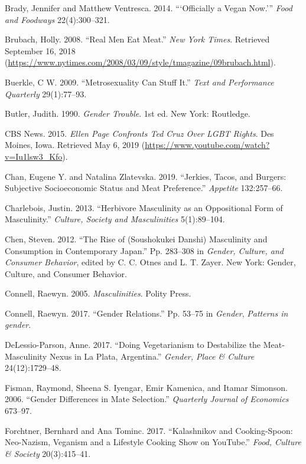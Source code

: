 \documentclass[twoside]{report}
\begin{document}
\hypertarget{brady}{Brady, Jennifer and Matthew Ventresca. 2014. ```Officially a Vegan
Now.''' \emph{Food and Foodways} 22(4):300--321.}

\hypertarget{brubach}{Brubach, Holly. 2008. ``Real Men Eat Meat.'' \emph{New York Times}.
Retrieved September 16, 2018
(\url{https://www.nytimes.com/2008/03/09/style/tmagazine/09brubach.html}).}

\hypertarget{buerkle}{Buerkle, C W. 2009. ``Metrosexuality Can Stuff It.'' \emph{Text and
Performance Quarterly} 29(1):77--93.}

\hypertarget{butler}{Butler, Judith. 1990. \emph{Gender Trouble}. 1st ed. New York:
Routledge.}

\hypertarget{cbs}{CBS News. 2015. \emph{Ellen Page Confronts Ted Cruz Over LGBT Rights}.
Des Moines, Iowa. Retrieved May 6, 2019
(\url{https://www.youtube.com/watch?v=Iu1lsw3_Kfo}).}

\hypertarget{chan}{Chan, Eugene Y. and Natalina Zlatevska. 2019. ``Jerkies, Tacos, and
Burgers: Subjective Socioeconomic Status and Meat Preference.''
\emph{Appetite} 132:257--66.}

\hypertarget{charlebois}{Charlebois, Justin. 2013. ``Herbivore Masculinity as an Oppositional
Form of Masculinity.'' \emph{Culture, Society and Masculinities}
5(1):89--104.}

\hypertarget{chen}{Chen, Steven. 2012. ``The Rise of (Soushokukei Danshi) Masculinity and
Consumption in Contemporary Japan.'' Pp. 283--308 in \emph{Gender,
Culture, and Consumer Behavior}, edited by C. C. Otnes and L. T. Zayer.
New York: Gender, Culture, and Consumer Behavior.}

\hypertarget{connell}{Connell, Raewyn. 2005. \emph{Masculinities}. Polity Press.}

\hypertarget{connell2}{Connell, Raewyn. 2017. ``Gender Relations.'' Pp. 53--75 in
\emph{Gender}, \emph{Patterns in gender}.}

\hypertarget{delassio-parson}{DeLessio-Parson, Anne. 2017. ``Doing Vegetarianism to Destabilize the
Meat-Masculinity Nexus in La Plata, Argentina.'' \emph{Gender, Place \&
Culture} 24(12):1729--48.}

\hypertarget{fisman}{Fisman, Raymond, Sheena S. Iyengar, Emir Kamenica, and Itamar Simonson.
2006. ``Gender Differences in Mate Selection.'' \emph{Quarterly Journal
of Economics} 673--97.}

\hypertarget{forchtner}{Forchtner, Bernhard and Ana Tominc. 2017. ``Kalashnikov and
Cooking-Spoon: Neo-Nazism, Veganism and a Lifestyle Cooking Show on
YouTube.'' \emph{Food, Culture \& Society} 20(3):415--41.}
\end{document}
